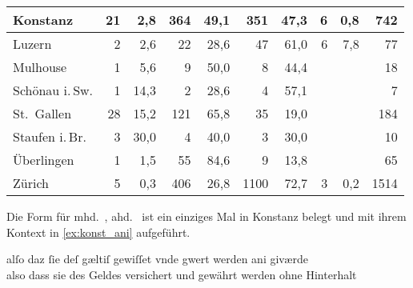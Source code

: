 \begin{table}
\begin{tabular}{
	l @{\qquad}
	r r @{\qquad}
	r r @{\qquad}
	r r @{\qquad}
	r r @{\qquad}
	r}
\midrule

Konstanz
	& 21 	& 2,8
	& 364	& 49,1
	& 351	& 47,3
	& 6		& 0,8
	& 742
	\\

\midrule

Luzern
	& 2		& 2,6
	& 22	& 28,6
	& 47	& 61,0
	& 6		& 7,8
	& 77
	\\

\midrule

Mulhouse
	& 1	& 5,6
	& 9	& 50,0
	& 8	& 44,4
	&	&
	& 18
	\\

\midrule

Schönau i.\,Sw.
	& 1	& 14,3
	& 2	& 28,6
	& 4	& 57,1
	&	&
	& 7
	\\

\midrule

St.~Gallen
	& 28	& 15,2
	& 121	& 65,8
	& 35	& 19,0
	&		&
	& 184
	\\

\midrule

Staufen i.\,Br.
	& 3 & 30,0
	& 4	& 40,0
	& 3	& 30,0
	&	&
	& 10
	\\

\midrule

Überlingen
	& 1		& 1,5	
	& 55	& 84,6
	& 9		& 13,8
	&		&
	& 65
	\\

\midrule

Zürich
	& 5		& 0,3
	& 406	& 26,8
	& 1100	& 72,7
	& 3		& 0,2
	& 1514
	\\



\bottomrule
\end{tabular}
\label{tab:ispelx}
\end{table}

Die Form  für mhd.~, ahd.~  ist ein
einziges Mal in Konstanz belegt und mit ihrem Kontext in \cref{ex:konst_ani}
aufgeführt.

\begin{exe}
\ex\label{ex:konst_ani}
	\gll alſo daz ſie deſ gæltiſ gewiſſet vnde gwert werden ani giværde \\
		also dass sie des Geldes versichert und gewährt werden ohne
			Hinterhalt \\
	\begin{taggedline}{\autocites(Konstanz, 1251)[\pno~17, 26.22]{cao1}}
	\trans {}
	\end{taggedline}
\end{exe}

